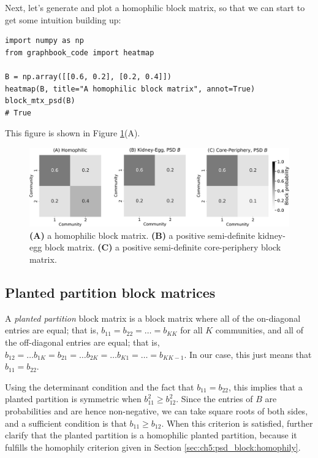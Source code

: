 Next, let's generate and plot a homophilic block matrix, so that we can start to get some intuition building up:

\begin{lstlisting}[style=python]
import numpy as np
from graphbook_code import heatmap

B = np.array([[0.6, 0.2], [0.2, 0.4]])
heatmap(B, title="A homophilic block matrix", annot=True)
block_mtx_psd(B)
# True
\end{lstlisting}

This figure is shown in Figure \ref{fig:ch5:psd_bmtx}(A).

\begin{figure}[h]
    \centering
    \includegraphics[width=\linewidth]{representations/ch5/Images/psd.png}
    \caption[PSD block matrices]{\textbf{(A)} a homophilic block matrix. \textbf{(B)} a positive semi-definite kidney-egg block matrix. \textbf{(C)} a positive semi-definite core-periphery block matrix.}
    \label{fig:ch5:psd_bmtx}
\end{figure}

\subsection{Planted partition block matrices}

A \textit{planted partition} block matrix is a block matrix where all of the on-diagonal entries are equal; that is, $b_{11} = b_{22} = \hdots = b_{KK}$ for all $K$ communities, and all of the off-diagonal entries are equal; that is, $b_{12} = \hdots b_{1K} = b_{21} = \hdots b_{2K} = \hdots b_{K1} = \hdots = b_{KK-1}$. In our case, this just means that $b_{11} = b_{22}$. 

Using the determinant condition and the fact that $b_{11} = b_{22}$, this implies that a planted partition is symmetric when $b_{11}^2 \geq b_{12}^2$. Since the entries of $B$ are probabilities and are hence non-negative, we can take square roots of both sides, and a sufficient condition is that $b_{11} \geq b_{12}$. When this criterion is satisfied, further clarify that the planted partition is a homophilic planted partition, because it fulfills the homophily criterion given in Section \ref{sec:ch5:psd_block:homophily}. 

